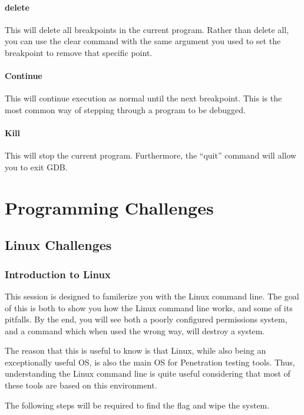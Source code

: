 \documentclass[a4paper,11pt]{report}
\begin{document}
		\paragraph{delete}
		This will delete all breakpoints in the current program. 
		Rather than delete all, 
		you can use the clear command with the same argument you used to set the breakpoint to remove that specific point. 

		\paragraph{Continue}
		This will continue execution as normal until the next breakpoint. 
		This is the most common way of stepping through a program to be debugged. 
			
		\paragraph{Kill}
		This will stop the current program. 
		Furthermore, the ``quit'' command will allow you to exit GDB. 

	\section{Programming Challenges}
		\subsection{Linux Challenges}
			\subsubsection{Introduction to Linux}
				This session is designed to familerize you with the Linux command line. 
				The goal of this is both to show you how the Linux command line works, and some of its pitfalls. 
				By the end, you will see both a poorly configured permissions system, and a command which when used the wrong way, will destroy a system. 

				The reason that this is useful to know is that Linux, while also being an exceptionally useful OS, is also the main OS for Penetration testing tools. 
				Thus, understanding the Linux command line is quite useful considering that most of these tools are based on this environment. 

				The following steps will be required to find the flag and wipe the system.  
	
\end{document}
